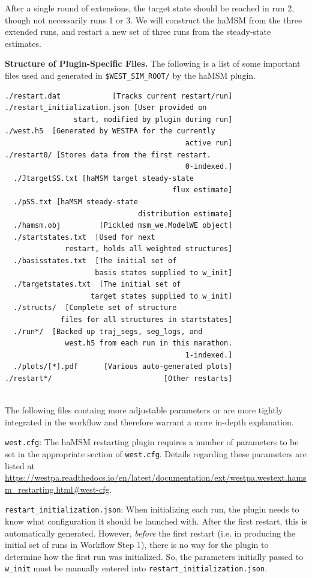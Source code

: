 After a single round of extensions, the target state should be reached in run 2, though not necessarily runs 1 or 3. 
We will construct the haMSM from the three extended runs, and restart a new set of three runs from the steady-state estimates.

\textbf{Structure of Plugin-Specific Files.} The following is a list of some important files used and generated in \verb|$WEST_SIM_ROOT/| by the haMSM plugin.


\begin{verbatim}
./restart.dat            [Tracks current restart/run]
./restart_initialization.json [User provided on 
                start, modified by plugin during run]
./west.h5  [Generated by WESTPA for the currently 
                                          active run]
./restart0/ [Stores data from the first restart. 
                                          0-indexed.]
  ./JtargetSS.txt [haMSM target steady-state 
                                       flux estimate]
  ./pSS.txt [haMSM steady-state 
                               distribution estimate]
  ./hamsm.obj         [Pickled msm_we.ModelWE object]
  ./startstates.txt  [Used for next 
              restart, holds all weighted structures]
  ./basisstates.txt  [The initial set of 
                     basis states supplied to w_init]
  ./targetstates.txt  [The initial set of 
                    target states supplied to w_init]
  ./structs/  [Complete set of structure 
             files for all structures in startstates]
  ./run*/  [Backed up traj_segs, seg_logs, and 
              west.h5 from each run in this marathon.
                                          1-indexed.]
  ./plots/[*].pdf      [Various auto-generated plots]
./restart*/                          [Other restarts]


\end{verbatim}

The following files containg more adjustable parameters or are more tightly integrated in the workflow and therefore warrant a more in-depth explanation.

\verb|west.cfg|: The haMSM restarting plugin requires a number of parameters to be set in the appropriate section of \verb|west.cfg|. 
Details regarding these parameters are listed at {\url{https://westpa.readthedocs.io/en/latest/documentation/ext/westpa.westext.hamsm_restarting.html#west-cfg}}.

\verb|restart_initialization.json|: When initializing each run, the plugin needs to know what configuration it should be launched with. 
After the first restart, this is automatically generated. 
However, \textit{before} the first restart (i.e. in producing the initial set of runs in Workflow Step 1), there is no way for the plugin to determine how the first run was initialized. 
So, the parameters initially passed to \verb|w_init| must be manually entered into \verb|restart_initialization.json|.

